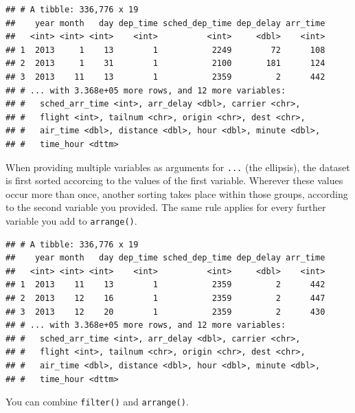 \documentclass[]{book}
\newenvironment{Shaded}{}{}
\newcommand{\DecValTok}[1]{#1}
\newcommand{\KeywordTok}[1]{\textcolor[rgb]{0.00,0.00,1.00}{#1}}
\newcommand{\NormalTok}[1]{#1}
\newcommand{\OperatorTok}[1]{#1}
\newcommand{\StringTok}[1]{\textcolor[rgb]{0.00,0.50,0.50}{#1}}
\begin{document}
\begin{verbatim}
## # A tibble: 336,776 x 19
##    year month   day dep_time sched_dep_time dep_delay arr_time
##   <int> <int> <int>    <int>          <int>     <dbl>    <int>
## 1  2013     1    13        1           2249        72      108
## 2  2013     1    31        1           2100       181      124
## 3  2013    11    13        1           2359         2      442
## # ... with 3.368e+05 more rows, and 12 more variables:
## #   sched_arr_time <int>, arr_delay <dbl>, carrier <chr>,
## #   flight <int>, tailnum <chr>, origin <chr>, dest <chr>,
## #   air_time <dbl>, distance <dbl>, hour <dbl>, minute <dbl>,
## #   time_hour <dttm>
\end{verbatim}

When providing multiple variables as arguments for \texttt{...} (the ellipsis), the dataset is first sorted accorcing to the values of the first variable.
Wherever these values occur more than once, another sorting takes place within those groups, according to the second variable you provided.
The same rule applies for every further variable you add to \texttt{arrange()}.

\begin{Shaded}
\end{Shaded}

\begin{verbatim}
## # A tibble: 336,776 x 19
##    year month   day dep_time sched_dep_time dep_delay arr_time
##   <int> <int> <int>    <int>          <int>     <dbl>    <int>
## 1  2013    11    13        1           2359         2      442
## 2  2013    12    16        1           2359         2      447
## 3  2013    12    20        1           2359         2      430
## # ... with 3.368e+05 more rows, and 12 more variables:
## #   sched_arr_time <int>, arr_delay <dbl>, carrier <chr>,
## #   flight <int>, tailnum <chr>, origin <chr>, dest <chr>,
## #   air_time <dbl>, distance <dbl>, hour <dbl>, minute <dbl>,
## #   time_hour <dttm>
\end{verbatim}

You can combine \texttt{filter()} and \texttt{arrange()}.

\begin{Shaded}
\end{Shaded}
\end{document}

